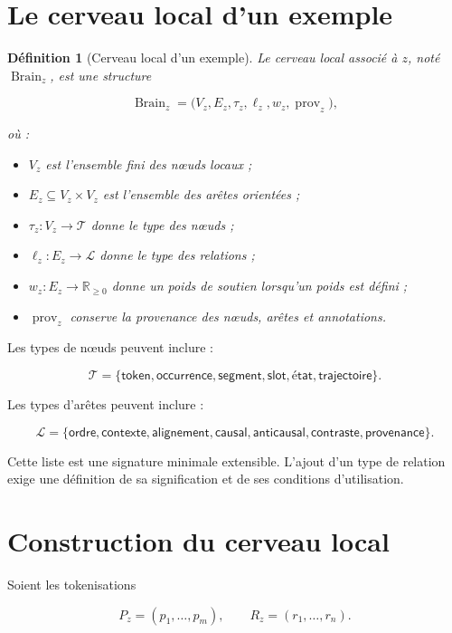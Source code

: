 \documentclass[11pt,a4paper,oneside]{book}
\newtheorem{definition}{Définition}[chapter]
\theoremstyle{remark}
\DeclareMathOperator{\Brain}{Brain}
\newcommand{\R}{\mathbb{R}}
\begin{document}
\section{Le cerveau local d'un exemple}

\begin{definition}[Cerveau local d'un exemple]
Le cerveau local associé à \(z\), noté \(\Brain_z\), est une structure

\[
\Brain_z=
\bigl(
V_z,E_z,\tau_z,\ell_z,w_z,\operatorname{prov}_z
\bigr),
\]

où :

\begin{itemize}
  \item \(V_z\) est l'ensemble fini des nœuds locaux ;
  \item \(E_z\subseteq V_z\times V_z\) est l'ensemble des arêtes
        orientées ;
  \item \(\tau_z:V_z\to\mathcal{T}\) donne le type des nœuds ;
  \item \(\ell_z:E_z\to\mathcal{L}\) donne le type des relations ;
  \item \(w_z:E_z\to\R_{\geq 0}\) donne un poids de soutien
        lorsqu'un poids est défini ;
  \item \(\operatorname{prov}_z\) conserve la provenance des nœuds,
        arêtes et annotations.
\end{itemize}
\end{definition}

Les types de nœuds peuvent inclure :

\[
\mathcal{T}=
\{
\mathsf{token},
\mathsf{occurrence},
\mathsf{segment},
\mathsf{slot},
\mathsf{état},
\mathsf{trajectoire}
\}.
\]

Les types d'arêtes peuvent inclure :

\[
\mathcal{L}=
\{
\mathsf{ordre},
\mathsf{contexte},
\mathsf{alignement},
\mathsf{causal},
\mathsf{anticausal},
\mathsf{contraste},
\mathsf{provenance}
\}.
\]

Cette liste est une signature minimale extensible. L'ajout d'un type
de relation exige une définition de sa signification et de ses
conditions d'utilisation.

\section{Construction du cerveau local}

Soient les tokenisations

\[
P_z=(p_1,\ldots,p_m),\qquad
R_z=(r_1,\ldots,r_n).
\]
\end{document}
